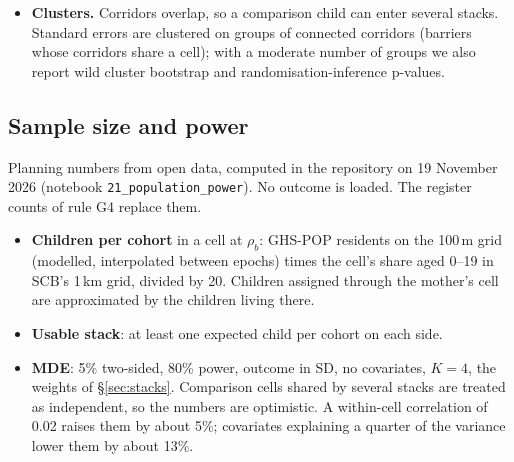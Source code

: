 \documentclass[11pt]{article}
\begin{document}
\begin{itemize}
\begin{itemize}
    year enters, including the many recent walls (71\% of dated road and 54\% of dated rail
    records were built 2015 or later).
  \item \textbf{Full window, \(e = -K, \dots, A + L\)}, for the ramp and the in-utero step. It
    needs scores up to \(\tau_b + A + L\), at least 17 years after construction. With grade-9
    data for 1996--2022 and the recommended \(K = 4\), \(L = 1\) (decision 1), that is
    \textbf{barriers built 2000--2005}. A plateau (\(L \ge 2\)) is out of reach for almost all
    walls.
  \end{itemize}
  The event study on all dated barriers, unbalanced, is a robustness check.
\item \textbf{Clusters.} Corridors overlap, so a comparison child can enter several stacks.
  Standard errors are clustered on groups of connected corridors (barriers whose corridors share
  a cell); with a moderate number of groups we also report wild cluster bootstrap and
  randomisation-inference p-values.
\end{itemize}

\subsection{Sample size and power}\label{sec:power}

Planning numbers from open data, computed in the repository on 19 November 2026 (notebook
\texttt{21\_population\_power}). No outcome is loaded. The register counts of rule G4 replace
them.
\begin{itemize}
\item \textbf{Children per cohort} in a cell at \(\rho_b\): GHS-POP residents on the 100\,m grid
  (modelled, interpolated between epochs) times the cell's share aged 0--19 in SCB's 1\,km grid,
  divided by 20. Children assigned through the mother's cell are approximated by the children
  living there.
\item \textbf{Usable stack}: at least one expected child per cohort on each side.
\item \textbf{MDE}: 5\% two-sided, 80\% power, outcome in SD, no covariates, \(K = 4\), the
  weights of \S\ref{sec:stacks}. Comparison cells shared by several stacks are treated as
  independent, so the numbers are optimistic. A within-cell correlation of 0.02 raises them by
  about 5\%; covariates explaining a quarter of the variance lower them by about 13\%.
\end{itemize}
\end{document}
